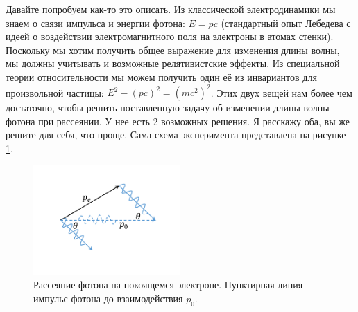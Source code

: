\documentclass[12pt]{article}
\begin{document}
\vspace{1em} \noindent
Давайте попробуем как-то это описать. Из классической электродинамики мы знаем о связи импульса и энергии фотона: $E = pc$ (стандартный опыт Лебедева с идеей о воздействии электромагнитного поля на электроны в атомах стенки). Поскольку мы хотим получить общее выражение для изменения длины волны, мы должны учитывать и возможные релятивистские эффекты. Из специальной теории относительности мы можем получить  один её из инвариантов для произвольной частицы: $E^2 -(pc)^2 = (mc^2)^2$. Этих двух вещей нам более чем достаточно, чтобы решить поставленную задачу об изменении длины волны фотона при рассеянии. У нее есть 2 возможных решения. Я расскажу оба, вы же решите для себя, что проще. Сама схема эксперимента представлена на рисунке \ref{fig:sem_02_kompton}.
\begin{figure}[h]
    \centering
    \includegraphics[width=0.5\textwidth,keepaspectratio]{Seminar_02/pics/pic_03.pdf}
    \caption{Рассеяние фотона на покоящемся электроне. Пунктирная линия -- импульс фотона до взаимодействия $p_0$.}
    \label{fig:sem_02_kompton}
\end{figure}
\end{document}
